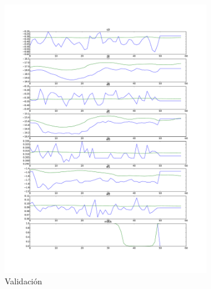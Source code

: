 \begin{figure}
\begin{subfigure}{0.3\textwidth}
		\includegraphics[width=\linewidth]{imagenes/resultados/pred_val.pdf}
		\caption{Validación}
		\label{fig:resultados/pred_val}
	\end{subfigure}
	\begin{subfigure}{0.3\textwidth}
		\centering

\end{subfigure}
\end{figure}

